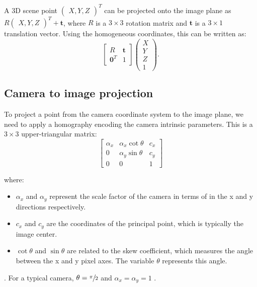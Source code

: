 A 3D scene point \(\begin{pmatrix}
	X, Y, Z
\end{pmatrix}^{T}\) can be projected onto the image plane as
\(R \begin{pmatrix}
	X, Y, Z
\end{pmatrix}^{T} + \mathbf{t}\), where \(R\) is a \(3 \times 3\) rotation matrix
and \(\mathbf{t}\) is
a \(3 \times 1\) translation vector. Using the homogeneous coordinates, this
can be written as:
\begin{equation}
	\begin{bmatrix}
		R              & \mathbf{t} \\
		\mathbf{0}^{T} & 1
	\end{bmatrix} \begin{pmatrix}
		X \\ Y \\ Z \\ 1
	\end{pmatrix}.
\end{equation}

\subsection{Camera to image projection}\label{sub:camera_to_image_projection}

To project a point from the camera coordinate system to the image plane, we
need to apply a homography encoding the camera intrinsic parameters.
This is a \(3 \times 3\) upper-triangular matrix:
\begin{equation}
	\begin{bmatrix}
		\alpha_x & \alpha_x \cot \theta & c_x \\
		0        & \alpha_y \sin \theta & c_y \\
		0        & 0                    & 1
	\end{bmatrix}
\end{equation}

where:
\begin{itemize}
	\item $\alpha_x$ and $\alpha_y$ represent the scale factor of the camera in
	      terms of  in the x and y directions respectively.
	\item $c_x$ and $c_y$ are the coordinates of the principal point, which is typically the image center.
	\item $\cot \theta$ and $\sin \theta$ are related to the skew coefficient, which measures the angle between the x and y pixel axes. The variable $\theta$ represents this angle.
\end{itemize}.
For a typical camera, \(\theta = \sfrac{\pi}{2}\) and \(\alpha_x = \alpha_y = 1
\) .

